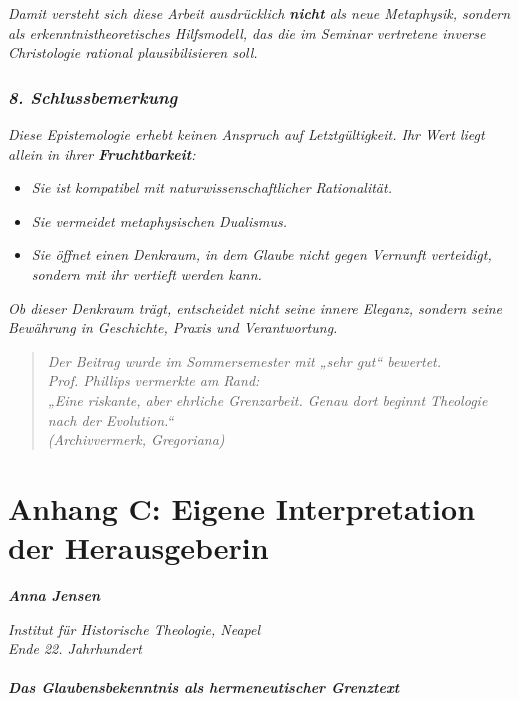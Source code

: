 \documentclass[
]{article}
\begin{document}
\emph{Damit versteht sich diese Arbeit ausdrücklich \textbf{nicht} als neue Metaphysik, sondern als erkenntnistheoretisches Hilfsmodell, das die im Seminar vertretene inverse Christologie rational plausibilisieren soll.}

\subsubsection{\texorpdfstring{\emph{\textbf{8. Schlussbemerkung}}}{8. Schlussbemerkung}}\label{schlussbemerkung}

\emph{Diese Epistemologie erhebt keinen Anspruch auf Letztgültigkeit. Ihr Wert liegt allein in ihrer \textbf{Fruchtbarkeit}:}

\begin{itemize}
\item
  \emph{Sie ist kompatibel mit naturwissenschaftlicher Rationalität.}
\item
  \emph{Sie vermeidet metaphysischen Dualismus.}
\item
  \emph{Sie öffnet einen Denkraum, in dem Glaube nicht gegen Vernunft verteidigt, sondern mit ihr vertieft werden kann.}
\end{itemize}

\emph{Ob dieser Denkraum trägt, entscheidet nicht seine innere Eleganz, sondern seine Bewährung in Geschichte, Praxis und Verantwortung.}

\begin{quote}
\emph{Der Beitrag wurde im Sommersemester mit „sehr gut`` bewertet.\\
Prof. Phillips vermerkte am Rand:\\
„Eine riskante, aber ehrliche Grenzarbeit. Genau dort beginnt Theologie nach der Evolution.``\\
(Archivvermerk, Gregoriana)}
\end{quote}

\section{\texorpdfstring{Anhang C: \textbf{Eigene Interpretation der Herausgeberin}}{Anhang C: Eigene Interpretation der Herausgeberin}}\label{anhang-c-eigene-interpretation-der-herausgeberin}

\emph{\textbf{Anna Jensen}}

\emph{Institut für Historische Theologie, Neapel\\
Ende 22. Jahrhundert}

\paragraph{\texorpdfstring{\emph{\textbf{Das Glaubensbekenntnis als hermeneutischer Grenztext}}}{Das Glaubensbekenntnis als hermeneutischer Grenztext}}\label{das-glaubensbekenntnis-als-hermeneutischer-grenztext}
\end{document}
